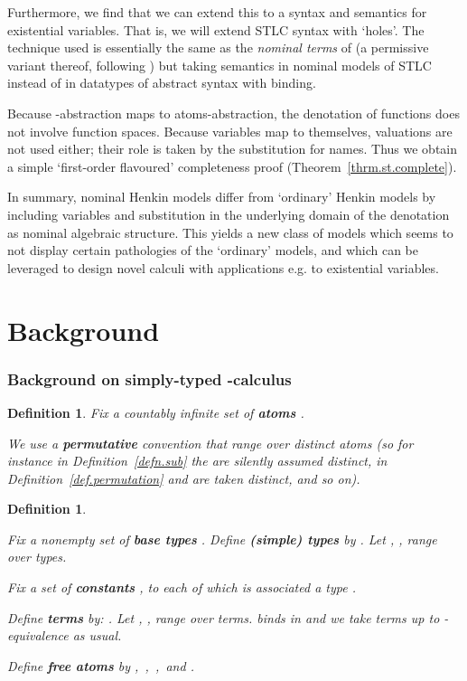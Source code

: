 \documentclass[submission,copyright]{eptcs}
\newtheorem{defn}[thrm]{Definition}
\newcommand{\deffont}[1]{\textbf{#1}}
\begin{document}
Furthermore, we find that we can extend this to a syntax and semantics for existential variables. 
That is, we will extend STLC syntax with `holes'. 
The technique used is essentially the same as the \emph{nominal terms} of \cite{gabbay:nomu-jv} (a permissive variant thereof, following \cite{gabbay:perntu,gabbay:perntu-jv}) but taking semantics in nominal models of STLC instead of in datatypes of abstract syntax with binding.


 



Because -abstraction maps to atoms-abstraction, the denotation of functions does not involve function spaces. 
Because variables map to themselves, valuations are not used either; their role is taken by the substitution for names.
Thus we obtain a simple `first-order flavoured' completeness proof (Theorem~\ref{thrm.st.complete}).

In summary, nominal Henkin models differ from `ordinary' Henkin models by including variables and substitution in the underlying domain of the denotation as nominal algebraic structure.
This yields a new class of models which seems to not display certain pathologies of the `ordinary' models, and which can be leveraged to design novel calculi with applications e.g. to existential variables.
 



\section{Background}

\subsubsection*{Background on simply-typed -calculus}

\begin{defn}
\label{defn.atoms}
Fix a countably infinite set of \deffont{atoms} .

We use a \deffont{permutative} convention that  range over \emph{distinct} atoms (so for instance in Definition~\ref{defn.sub} the  are silently assumed distinct, in Definition~\ref{def.permutation}  and  are taken distinct, and so on).
\end{defn}

\begin{defn}
\label{defn.pts.sorts}
\begin{enumerate*}
\item
Fix a nonempty set of \deffont{base types} .
Define \deffont{(simple) types} by
.
Let , ,  range over types.
\label{defn.terms.and.substitutions}
\item
Fix a set of \deffont{constants} , to each of which is associated a type .

\noindent Define \deffont{terms} by:
.
Let , ,  range over terms.
 binds  in  and we take terms up to -equivalence as usual. 
\end{enumerate*}
\noindent Define \deffont{free atoms}  by
,\ 
,\ 
,\ 
and
. 
\end{defn}
\end{document}
